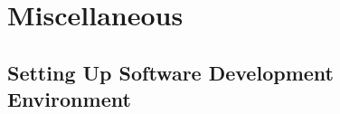 









\chapter{Miscellaneous}
\label{chp:Miscellaneous}




\section{Setting Up Software Development Environment}
\label{sec:SettingUpSoftwareDevelopmentEnvironment}

